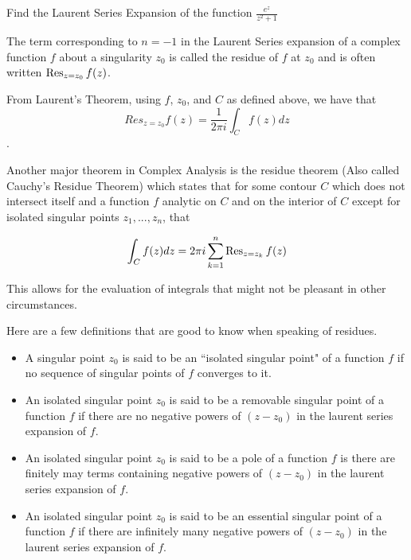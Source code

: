 \begin{problem}
Find the Laurent Series Expansion of the function $\frac{e^{z}}{z^2 +1}$
\end{problem}


The term corresponding to $n=-1$ in the Laurent Series expansion of a complex function $f$ about a singularity $z_0$ is called the residue of $f$ at $z_0$ and is often written $\operatorname{Res}_{z=z_0} f(z)$.

From Laurent's Theorem, using $f$, $z_0$, and $C$ as defined above, we have that $$Res_{z=z_0} f(z) = \frac{1}{2 \pi i} \int_C f(z) dz$$.

Another major theorem in Complex Analysis is the residue theorem (Also called Cauchy's Residue Theorem) which states that for some contour $C$ which does not intersect itself and a function $f$ analytic on $C$ and on the interior of $C$ except for isolated singular points $z_1,...,z_n$, that 

$$\int_C f(z) dz = 2 \pi i \sum_{k=1}^{n} \operatorname{Res}_{z=z_k} f(z)$$

This allows for the evaluation of integrals that might not be pleasant in other circumstances.


Here are a few definitions that are good to know when speaking of residues.
\begin{itemize}
\item A singular point $z_0$ is said to be an ``isolated singular point" of a function $f$ if no sequence of singular points of $f$ converges to it.
\item An isolated singular point $z_0$ is said to be a removable singular point of a function $f$ if there are no negative powers of $(z-z_0)$ in the laurent series expansion of $f$.
\item An isolated singular point $z_0$ is said to be a pole of a function $f$ is there are finitely may terms containing negative powers of $(z-z_0)$ in the laurent series expansion of $f$. 
\item An isolated singular point $z_0$ is said to be an essential singular point of a function $f$ if there are infinitely many negative powers of $(z-z_0)$ in the laurent series expansion of $f$.
\end{itemize}


